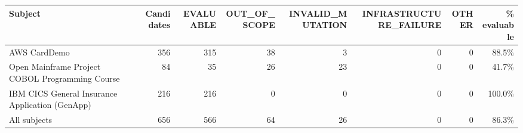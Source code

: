 \begin{tabular}{lrrrrrrr}
\toprule
Subject & Candidates & EVALUABLE & OUT\_OF\_SCOPE & INVALID\_MUTATION & INFRASTRUCTURE\_FAILURE & OTHER & \% evaluable \\
\midrule
AWS CardDemo & 356 & 315 & 38 & 3 & 0 & 0 & 88.5\% \\
Open Mainframe Project COBOL Programming Course & 84 & 35 & 26 & 23 & 0 & 0 & 41.7\% \\
IBM CICS General Insurance Application (GenApp) & 216 & 216 & 0 & 0 & 0 & 0 & 100.0\% \\
All subjects & 656 & 566 & 64 & 26 & 0 & 0 & 86.3\% \\
\bottomrule
\end{tabular}
